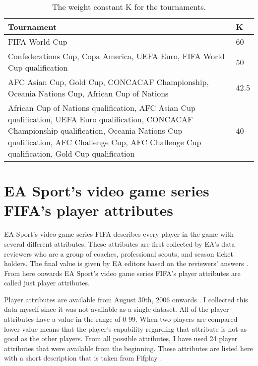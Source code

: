 \begin{table}[h]
        \caption{The weight constant $\mathrm { K }$ for the tournaments.}
        \label{table:weight_constant}
        \noindent
        \begin{tabular}{|p{8cm}|p{3cm}|}
            \hline
            Tournament & K \\\hline
            FIFA World Cup & 60 \\\hline
            Confederations Cup, Copa America, UEFA Euro, FIFA World Cup qualification & 50 \\\hline
            AFC Asian Cup, Gold Cup, CONCACAF Championship, Oceania Nations Cup, African Cup of Nations & $42.5$\\\hline
            African Cup of Nations qualification, AFC Asian Cup qualification, UEFA Euro qualification, CONCACAF Championship qualification, Oceania Nations Cup qualification, AFC Challenge Cup, AFC Challenge Cup qualification, Gold Cup qualification & 40 \\\hline
        \end{tabular}
    \end{table}

\section{EA Sport’s video game series FIFA's player attributes}
EA Sport's video game series FIFA describes every player in the game with several different attributes. These attributes are first collected by EA's data reviewers who are a group of coaches, professional scouts, and season ticket holders. The final value is given by EA editors based on the reviewers' answers \cite{playerattr}. From here onwards EA Sport's video game series FIFA's player attributes are called just player attributes.

Player attributes are available from August 30th, 2006 onwards \cite{sofifa}. I collected this data myself since it was not available as a single dataset.
All of the player attributes have a value in the range of 0-99. When two players are compared lower value means that the player's capability regarding that attribute is not as good as the other players. From all possible attributes, I have used 24 player attributes that were available from the beginning. These attributes are listed here with a short description that is taken from Fifplay \cite{playerattr}.

